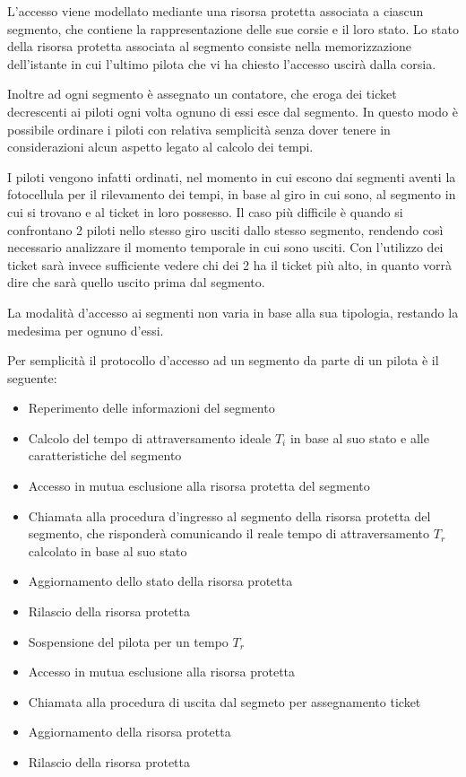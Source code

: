 \documentclass[a4paper,11pt, twoside]{book}
\begin{document}
      L'accesso viene modellato mediante una risorsa protetta associata a ciascun segmento, che contiene
      la rappresentazione delle sue corsie e il loro stato. Lo stato della risorsa protetta associata al segmento
      consiste nella memorizzazione dell'istante in cui l'ultimo pilota che vi ha chiesto l'accesso uscirà dalla corsia.
      
      Inoltre ad ogni segmento è assegnato un contatore, che eroga dei ticket decrescenti ai piloti ogni volta ognuno di
      essi esce dal segmento. In questo modo è possibile ordinare i piloti con relativa semplicità senza
      dover tenere in considerazioni alcun aspetto legato al calcolo dei tempi. 
      
      I piloti vengono infatti ordinati, nel momento in cui escono dai segmenti aventi la fotocellula per il rilevamento dei tempi,
      in base al giro in cui sono, al segmento in cui si trovano e al ticket in loro possesso.
      Il caso più difficile è quando si confrontano 2 piloti nello stesso giro usciti dallo stesso segmento,
      rendendo così necessario analizzare il momento temporale in cui sono usciti. Con l'utilizzo dei ticket sarà invece
      sufficiente vedere chi dei 2 ha il ticket più alto, in quanto vorrà dire che sarà quello uscito prima dal segmento.
      
      La modalità d'accesso ai segmenti non varia in base alla sua tipologia, restando la medesima per ognuno d'essi.
      
      Per semplicità il protocollo d'accesso ad un segmento da parte di un pilota è il seguente:
      
      \begin{itemize}
	\item Reperimento delle informazioni del segmento
	\item Calcolo del tempo di attraversamento ideale $T_i$ in base al suo stato e alle caratteristiche del segmento
	\item Accesso in mutua esclusione alla risorsa protetta del segmento
	\item Chiamata alla procedura d'ingresso al segmento della risorsa protetta del segmento, che risponderà comunicando 
	      il reale tempo di attraversamento $T_r$ calcolato in base al suo stato
	\item Aggiornamento dello stato della risorsa protetta
	\item Rilascio della risorsa protetta
	\item Sospensione del pilota per un tempo $T_r$
	\item Accesso in mutua esclusione alla risorsa protetta
	\item Chiamata alla procedura di uscita dal segmeto per assegnamento ticket
	\item Aggiornamento della risorsa protetta
	\item Rilascio della risorsa protetta
      \end{itemize}
      
\end{document}
